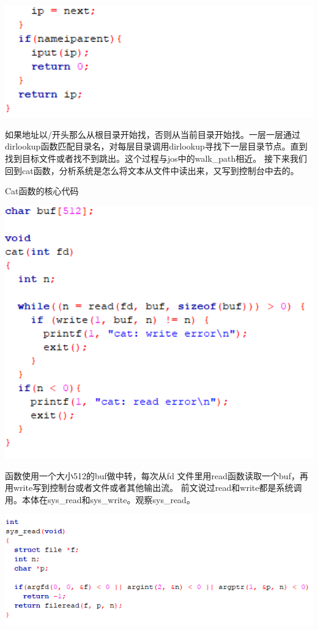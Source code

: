 \includegraphics[width=6in]{figures/eg_file/image174.png}

如果地址以/开头那么从根目录开始找，否则从当前目录开始找。一层一层通过dirlookup函数匹配目录名，对每层目录调用dirlookup寻找下一层目录节点。直到找到目标文件或者找不到跳出。这个过程与jos中的walk\_path相近。
接下来我们回到cat函数，分析系统是怎么将文本从文件中读出来，又写到控制台中去的。

Cat函数的核心代码

\includegraphics[width=6in]{figures/eg_file/image175.png}


函数使用一个大小512的buf做中转，每次从fd
文件里用read函数读取一个buf，再用write写到控制台或者文件或者其他输出流。
前文说过read和write都是系统调用。本体在sys\_read和sys\_write。观察sys\_read。

\includegraphics[width=6in]{figures/eg_file/image176.png}

